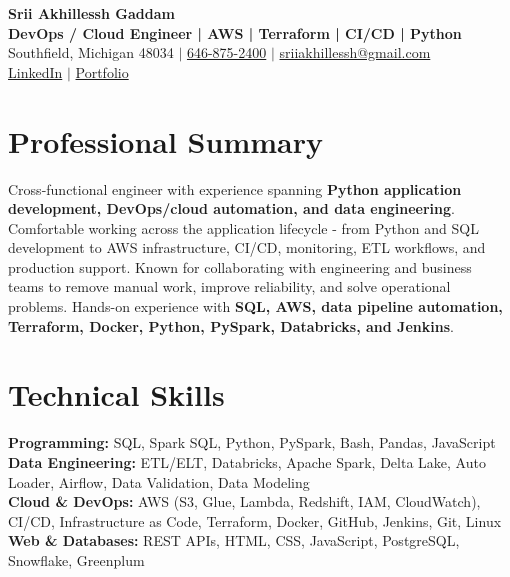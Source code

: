 \documentclass[letterpaper,10pt]{article}
\begin{document}
\fontsize{9.35pt}{10.45pt}\selectfont

\begin{center}
    {\LARGE \textbf{Srii Akhillessh Gaddam}} \\[-1pt]
    \textbf{DevOps / Cloud Engineer | AWS | Terraform | CI/CD | Python} \\[2pt]
    Southfield, Michigan 48034 $|$
    \href{tel:6468752400}{646-875-2400} $|$
    \href{mailto:sriiakhillessh@gmail.com}{sriiakhillessh@gmail.com} \\[1pt]
    \href{https://www.linkedin.com/in/srii-akhiilessh-gaddam-b48668191/}{LinkedIn} $|$
    \href{https://sriiakhillesshg.github.io/portfolio/}{Portfolio}
\end{center}
\vspace{-8pt}

\section{Professional Summary}
\small{Cross-functional engineer with experience spanning \textbf{Python application development, DevOps/cloud automation, and data engineering}. Comfortable working across the application lifecycle - from Python and SQL development to AWS infrastructure, CI/CD, monitoring, ETL workflows, and production support. Known for collaborating with engineering and business teams to remove manual work, improve reliability, and solve operational problems. Hands-on experience with \textbf{SQL, AWS, data pipeline automation, Terraform, Docker, Python, PySpark, Databricks, and Jenkins}.}

\section{Technical Skills}
\small{
\textbf{Programming:} SQL, Spark SQL, Python, PySpark, Bash, Pandas, JavaScript \\
\textbf{Data Engineering:} ETL/ELT, Databricks, Apache Spark, Delta Lake, Auto Loader, Airflow, Data Validation, Data Modeling \\
\textbf{Cloud \& DevOps:} AWS (S3, Glue, Lambda, Redshift, IAM, CloudWatch), CI/CD, Infrastructure as Code, Terraform, Docker, GitHub, Jenkins, Git, Linux \\
\textbf{Web \& Databases:} REST APIs, HTML, CSS, JavaScript, PostgreSQL, Snowflake, Greenplum
}
\end{document}
